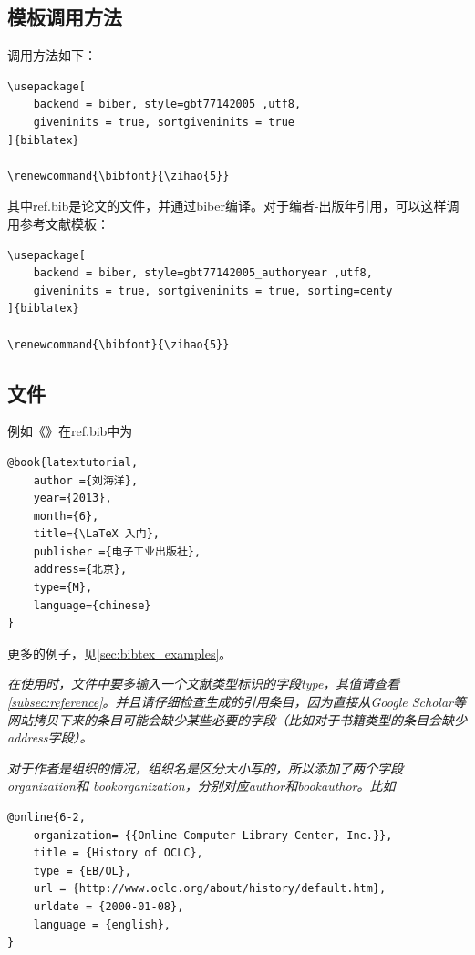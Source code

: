 \documentclass{LZU}
\renewcommand{\bibfont}{\zihao{5}}
\newenvironment{note}{\par\itshape\noindent{\makebox[-5pt][r]{\scriptsize\color{red!90}\textdbend\quad}}}{\par}
\newcommand{\filename}[1]{{\ttfamily #1}}
\begin{document}
\subsection{模板调用方法}
调用方法如下：
\begin{verbatim}
\usepackage[
    backend = biber, style=gbt77142005 ,utf8,
    giveninits = true, sortgiveninits = true
]{biblatex}

\renewcommand{\bibfont}{\zihao{5}}
\end{verbatim}
其中\filename{ref.bib}是论文的文件，并通过biber\autocite{biber}编译。对于编者-出版年引用，可以这样调用参考文献模板：
\begin{verbatim}
\usepackage[
    backend = biber, style=gbt77142005_authoryear ,utf8,
    giveninits = true, sortgiveninits = true, sorting=centy
]{biblatex}

\renewcommand{\bibfont}{\zihao{5}}
\end{verbatim}
\subsection{文件}
例如《》\supercite{latextutorial}在\filename{ref.bib}中为
\begin{verbatim}
@book{latextutorial,
    author ={刘海洋},
    year={2013},
    month={6},
    title={\LaTeX 入门},
    publisher ={电子工业出版社},
    address={北京},
    type={M},
    language={chinese}
}
\end{verbatim}
更多的例子，见\cref{sec:bibtex_examples}。
\begin{note}
    在使用时，文件中要多输入一个文献类型标识的字段type，其值请查看\cref{subsec:reference}。并且请仔细检查生成的引用条目，因为直接从Google Scholar等网站拷贝下来的条目可能会缺少某些必要的字段（比如对于书籍类型的条目会缺少address字段）。
\end{note}
\begin{note}
对于作者是组织的情况，组织名是区分大小写的，所以添加了两个字段organization和
bookorganization，分别对应author和bookauthor。比如
\begin{verbatim}
@online{6-2,
    organization= {{Online Computer Library Center, Inc.}},
    title = {History of OCLC},
    type = {EB/OL},
    url = {http://www.oclc.org/about/history/default.htm},
    urldate = {2000-01-08},
    language = {english},
}
\end{verbatim}
\end{note}
\end{document}
